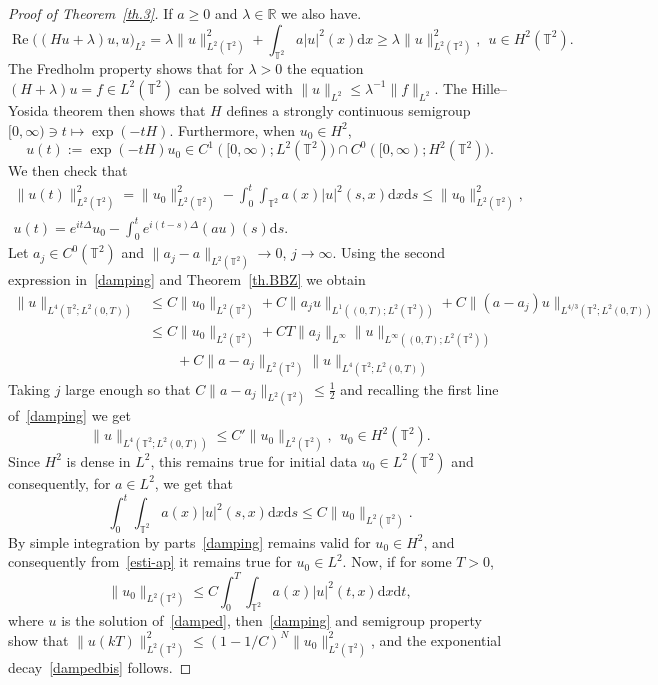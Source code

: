 \documentclass[AHL, Unicode, longabstracts]{cedram}
\DeclareMathOperator{\Reop}{Re}
\renewcommand{\Re}{\Reop}
\newcommand{\R}{{\mathbb R}}
\newcommand{\TT}{{\mathbb T}}
\newcommand{\TT}{{\mathbb T}}
\newcommand{\R}{{\mathbb R}}
\newcommand*{\dd}{\mathrm{d}}
\newcommand*{\dx}{\dd x}
\newcommand*{\ds}{\dd s}
\newcommand*{\dt}{\dd t}
\begin{document}
\begin{proof}[Proof of Theorem~\ref{th.3}]
If $ a \geq 0 $ and $ \lambda \in \R $ we also have.
\[
\Re \bigl((Hu + \lambda) u, u \bigr)_{L^2} =
\lambda \| u \|_{L^2(\TT^2)} ^2 +
\int_{\TT^2} a |u|^2 (x) \dx \geq \lambda \| u \|_{L^2(\TT^2)} ^2, \ \ u \in H^2 (\TT^2).\ \
\]
The Fredholm property shows that for $\lambda >0$ the equation $(H + \lambda) u =f \in L^2(\TT^2)$ can be solved with $ \| u \|_{ L^2 } \leq \lambda^{-1} \| f \|_{L^2 } $. The Hille--Yosida theorem then shows that $ H $ defines a strongly continuous semigroup $ [0, \infty) \ni t \mapsto \exp (- t H) $. Furthermore, when $u_0 \in H^2$,
\[
u(t) := \exp (- t H) u_0 \in C^1([0, \infty) ; L^2(\TT^2))\cap C^0([0, \infty) ; H^2(\TT^2)).
\]
We then check that
\begin{equation}\label{damping}
\begin{gathered}
\| u(t) \|^2_{L^2(\TT^2)} = \| u_0 \|^2_{L^2(\TT^2)}- \int_0 ^t \int_{\TT^2} a(x) |u|^2(s,x) \dx \ds \leq \| u_0 \|^2_{L^2(\TT^2)},\\
u(t) = e^{it \Delta} u_0 - \int_0^t e^{i(t-s)\Delta} (au)(s) \ds.
\end{gathered}
\end{equation}
Let $a_j \in C^0 (\TT^2) $ and $ \| a_j - a\|_{L^2 (\TT^2) } \to 0 $, $ j \to \infty $. Using the second expression in~\eqref{damping} and Theorem~\ref{th.BBZ} we obtain
\[
\begin{split}
\| u\|_{L^4(\TT^2; L^2(0,T))} & \leq C \| u_0 \|_{L^2(\TT^2)} + C\| a_j u \|_{L^1((0,T); L^2(\TT^2))} + C\| (a- a_j)u \|_{L^{4/3}(\TT^2; L^2(0,T))}\\
& \leq C \| u_0 \|_{L^2(\TT^2)} +C T\| a_j\|_{L^\infty} \| u\|_{L^{\infty}((0,T); L^2(\TT^2))}
\\ & \qquad +C\| a-a_j\|_{L^2(\TT^2)} \| u \|_{L^{4}(\TT^2; L^2(0,T))}
\end{split}
\]
Taking $ j$ large enough so that $C\| a-a_j\|_{L^2(\TT^2)} \leq \frac12$ and recalling the first line of~\eqref{damping} we get
\[
\| u\|_{L^4(\TT^2; L^2(0,T))} \leq C' \| u_0 \|_{L^2(\TT^2)}, \ \
u_0 \in H^2 (\TT^2).
\]
Since $ H^2 $ is dense in $L ^2 $, this remains true for initial data $u_0\in L^2(\TT^2)$ and consequently, for $ a \in L^2 $, we get that
\begin{equation}\label{esti-ap}
\int_0 ^t \int_{\TT^2} a(x) |u|^2(s,x) \dx \ds\leq C \| u_0 \|_{L^2(\TT^2)}.
\end{equation}
By simple integration by parts~\eqref{damping} remains valid for $u_0\in H^2$, and consequently from~\eqref{esti-ap} it remains true for $u_0\in L^2$. Now, if for some $ T > 0 $,
\begin{equation}\label{eq:u00}
\| u_0 \|_{L^2(\TT^2)} \leq C \int_0 ^T \int_{\TT^2} a(x) |u|^2(t,x) \dx \dt,
\end{equation}
where $u$ is the solution of~\eqref{damped}, then~\eqref{damping} and semigroup property show that $ \| u (k T) \|_{ L^2 (\TT^2)}^2 \leq (1 - 1/C)^N \| u_0 \|_{ L^2 (\TT^2) }^2$, and the exponential decay~\eqref{dampedbis} follows.


\end{proof}
\end{document}
